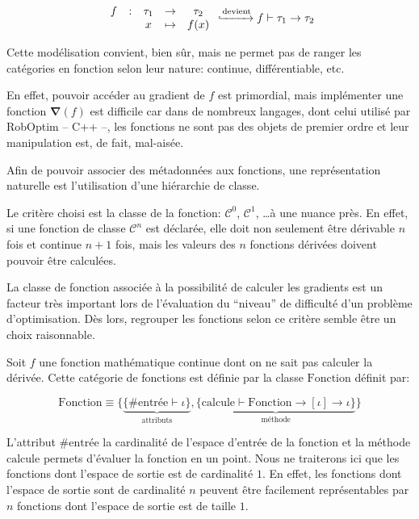 \begin{equation}
  \begin{array}{ccccc}
    f & : & \tau_1 & \rightarrow & \tau_2\\
      &   & x      & \mapsto     & f(x)
  \end{array}
  \xhookrightarrow{\text{devient}}
  f \vdash \tau_1 \rightarrow \tau_2
\end{equation}

Cette modélisation convient, bien sûr, mais ne permet pas de ranger
les catégories en fonction selon leur nature: continue,
différentiable, etc.

En effet, pouvoir accéder au gradient de $f$ est primordial, mais
implémenter une fonction $\mathbf{\nabla}(f)$ est difficile car dans
de nombreux langages, dont celui utilisé par RobOptim -- C++ --, les
fonctions ne sont pas des objets de premier ordre et leur manipulation
est, de fait, mal-aisée.

Afin de pouvoir associer des métadonnées aux fonctions, une
représentation naturelle est l'utilisation d'une hiérarchie de classe.

Le critère choisi est la classe de la fonction: $\mathcal{C}^0$,
$\mathcal{C}^1$, \ldots à une nuance près. En effet, si une fonction
de classe $\mathcal{C}^n$ est déclarée, elle doit non seulement être
dérivable $n$ fois et continue $n+1$ fois, mais les valeurs des $n$
fonctions dérivées doivent pouvoir être calculées.

La classe de fonction associée à la possibilité de calculer les
gradients est un facteur très important lors de l'évaluation du
``niveau'' de difficulté d'un problème d'optimisation. Dès lors,
regrouper les fonctions selon ce critère semble être un choix
raisonnable.

\begin{mydef}\label{def:chap1_fcn}
  Soit $f$ une fonction mathématique continue dont on ne sait pas
  calculer la dérivée. Cette catégorie de fonctions est définie par la
  classe $\text{Fonction}$ définit par:

  \begin{equation}
    \text{Fonction} \equiv \{ \underbrace{\{ \#\text{entrée} \vdash
      \iota \}}_{\text{attributs}}, \underbrace{\{ \text{calcule}
      \vdash \text{Fonction} \rightarrow[\iota] \rightarrow \iota \}}_{\text{méthode}} \}
  \end{equation}

  L'attribut $\#\text{entrée}$ la cardinalité de l'espace d'entrée de
  la fonction et la méthode $\text{calcule}$ permets d'évaluer la
  fonction en un point. Nous ne traiterons ici que les fonctions dont
  l'espace de sortie est de cardinalité $1$. En effet, les fonctions
  dont l'espace de sortie sont de cardinalité $n$ peuvent être
  facilement représentables par $n$ fonctions dont l'espace de sortie
  est de taille $1$.
\end{mydef}

